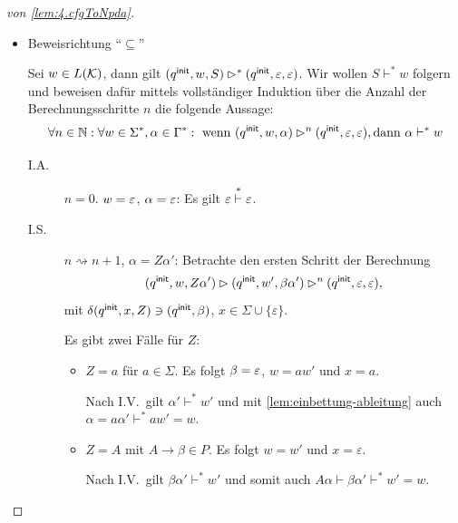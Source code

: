 \begin{proof}[von \autoref{lem:4.cfgToNpda}]
\begin{itemize}
\begin{itemize}
   Nach Konstruktion gilt $(\qinit, BC) \in \delta(\qinit, \Eps, A)$. 

   Nach I.V. gilt $(\qinit, u_1, B) \ConfRel^* (\qinit, \Eps, \Eps)$
   und $(\qinit, u_2, C) \ConfRel^* (\qinit, \Eps, \Eps)$. 

        Mit \autoref{lem:4.mehrKeller} folgt schließlich:
        \begin{align*}
          (\qinit, w, A) = (\qinit, u_1u_2, A)
          &\ConfRel (\qinit, u_1u_2, BC) \\
          &\ConfRel^* (\qinit, u_2, C) \\
          &\ConfRel^* (\qinit, \Eps, \Eps).
        \end{align*}
  \end{itemize}
 \item Beweisrichtung  "`$\subseteq$"'
 
 Sei $w\in L(\mathcal{K})$, dann gilt $(q^\mathsf{init}, w, S) \rhd^* (q^\mathsf{init}, \varepsilon, \varepsilon)$.
 Wir wollen $S \vdash^* w$ folgern und beweisen dafür mittels
 vollständiger Induktion über die Anzahl der Berechnungsschritte $n$
 die folgende Aussage: 
     \begin{displaymath}
      \forall n \in \mathbb{N}: \forall w \in \Sigma^*, \alpha \in \Gamma^*: \text{ wenn } (q^\mathsf{init}, w, \alpha) \rhd^n (q^\mathsf{init}, \varepsilon, \varepsilon), \text{dann } \alpha \vdash^* w
    \end{displaymath}
    
    \begin{description}
    \item[I.A.] $n = 0$.
      $w = \varepsilon$, $\alpha = \varepsilon$: Es gilt $\varepsilon \stackrel{*}{\vdash} \varepsilon$.

  \item[I.S.] $n\rightsquigarrow n+1$, $\alpha = Z\alpha'$: Betrachte
    den ersten Schritt der Berechnung
    $$(q^\mathsf{init},w,Z\alpha') \rhd (q^\mathsf{init}, w', \beta\alpha') \rhd^n (q^\mathsf{init}, \varepsilon, \varepsilon),$$ 
    mit $\delta(q^\mathsf{init}, x, Z) \ni (q^\mathsf{init}, \beta)$, $x \in \Sigma \cup
    \{\varepsilon\}$. 

    Es gibt zwei Fälle für $Z$:
    \begin{itemize}
    \item $Z = a$ für $a \in \Sigma$.
%
      Es folgt $\beta = \varepsilon$, $w = aw'$ und $x = a$.

      Nach I.V.\ gilt $\alpha' \vdash^* w'$ und mit
      \autoref{lem:einbettung-ableitung} auch $\alpha =
      a\alpha' \vdash^* aw' = w$.  
    \item $Z = A$ mit $A \to \beta \in P$.
%
      Es folgt $w = w'$ und $x = \varepsilon$.

      Nach I.V.\ gilt $\beta\alpha' \vdash^* w'$ und somit auch
      $A\alpha \vdash \beta\alpha' \vdash^* w' = w$. 
      \qedhere
    \end{itemize}
    \end{description}
\end{itemize}
\end{proof}


